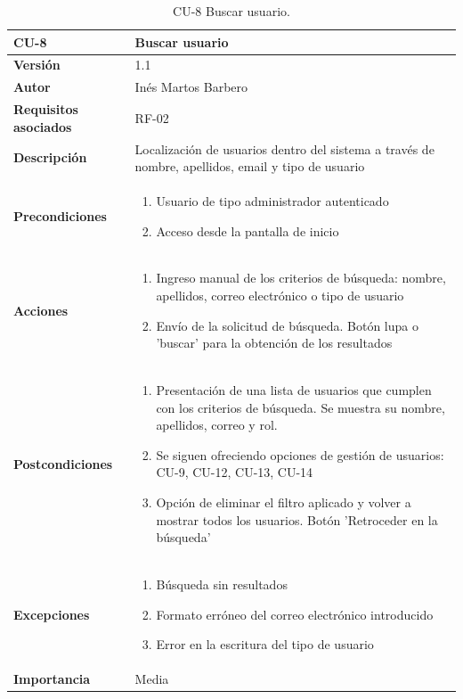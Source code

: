 \begin{table}[p]
	\centering
	\begin{tabularx}{\linewidth}{ p{} p{} }
		\toprule
		\textbf{CU-8}    & \textbf{Buscar usuario}\\
		\toprule
		\textbf{Versión}              & 1.1    \\
		\textbf{Autor}                & Inés Martos Barbero \\
		\textbf{Requisitos asociados} & RF-02 \\
		\textbf{Descripción}          & Localización de usuarios dentro del sistema a través de nombre, apellidos, email y tipo de usuario \\
		\textbf{Precondiciones}         & 
            \begin{enumerate}
			\def\labelenumi{\arabic{enumi}.}
			\tightlist
			\item Usuario de tipo administrador autenticado
			\item Acceso desde la pantalla de inicio
		\end{enumerate}\\
		\textbf{Acciones}             &
		\begin{enumerate}
			\def\labelenumi{\arabic{enumi}.}
			\tightlist
			\item Ingreso manual de los criterios de búsqueda: nombre, apellidos, correo electrónico o tipo de usuario
			\item Envío de la solicitud de búsqueda. Botón lupa o 'buscar' para la obtención de los resultados
		\end{enumerate}\\
		\textbf{Postcondiciones}        & 
            \begin{enumerate}
			\def\labelenumi{\arabic{enumi}.}
			\tightlist
			\item Presentación de una lista de usuarios que cumplen con los criterios de búsqueda. Se muestra su nombre, apellidos, correo y rol.
			\item Se siguen ofreciendo opciones de gestión de usuarios: CU-9, CU-12, CU-13, CU-14
            \item Opción de eliminar el filtro aplicado y volver a mostrar todos los usuarios. Botón 'Retroceder en la búsqueda'
		\end{enumerate}\\
		\textbf{Excepciones}          & 
            \begin{enumerate}
			\def\labelenumi{\arabic{enumi}.}
			\tightlist
			\item Búsqueda sin resultados
			\item Formato erróneo del correo electrónico introducido
            \item Error en la escritura del tipo de usuario
		\end{enumerate}\\
		\textbf{Importancia}          & Media \\
		\bottomrule
	\end{tabularx}
	\caption{CU-8 Buscar usuario.}
\end{table}

